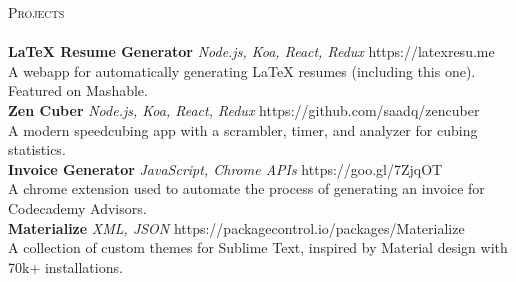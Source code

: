 \documentclass[a4paper]{article}
\newcommand{\lineunder} {
    \vspace*{-8pt} \\
    \hspace*{-18pt} \hrulefill \\
}
\newcommand{\header} [1] {
    {\hspace*{-18pt}\vspace*{6pt} \textsc{#1}}
    \vspace*{-6pt} \lineunder
}
\begin{document}
\header{Projects}
{\textbf{LaTeX Resume Generator} \sl Node.js, Koa, React, Redux} \hfill https://latexresu.me\\
A webapp for automatically generating LaTeX resumes (including this one). Featured on Mashable.\\
\vspace*{2mm}
{\textbf{Zen Cuber} \sl Node.js, Koa, React, Redux} \hfill https://github.com/saadq/zencuber\\
A modern speedcubing app with a scrambler, timer, and analyzer for cubing statistics.\\
\vspace*{2mm}
{\textbf{Invoice Generator} \sl JavaScript, Chrome APIs} \hfill https://goo.gl/7ZjqOT\\
A chrome extension used to automate the process of generating an invoice for Codecademy Advisors.\\
\vspace*{2mm}
{\textbf{Materialize} \sl XML, JSON} \hfill https://packagecontrol.io/packages/Materialize\\
A collection of custom themes for Sublime Text, inspired by Material design with 70k+ installations.\\
\vspace*{2mm}

\vspace*{2mm}

        

\ 
\end{document}
